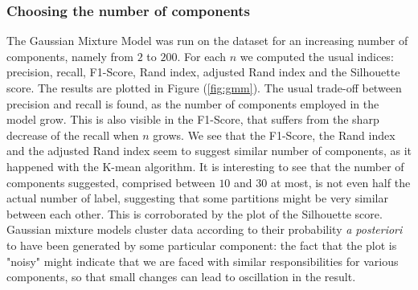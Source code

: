 \documentclass[a4paper]{article}
\begin{document}
 	\subsubsection{Choosing the number of components}
 
 	The Gaussian Mixture Model was run on the dataset for an increasing number of components, namely from $2$ to $200$. For each $n$ we computed the usual indices: precision, recall, F1-Score, Rand index, adjusted Rand index and the Silhouette score. The results are plotted in Figure (\ref{fig:gmm}).
 	The usual trade-off between precision and recall is found, as the number of components employed in the model grow. This is also visible in the F1-Score, that suffers from the sharp decrease of the recall when $n$ grows. We see that the F1-Score, the Rand index and the adjusted Rand index seem to suggest similar number of components, as it happened with the K-mean algorithm. It is interesting to see that the number of components suggested, comprised between $10$ and $30$ at most, is not even half the actual number of label, suggesting that some partitions might be very similar between each other. This is corroborated by the plot of the Silhouette score. Gaussian mixture models cluster data according to their probability \textit{a posteriori} to have been generated by some particular component: the fact that the plot is "noisy" might indicate that we are faced with similar responsibilities for various components, so that small changes can lead to oscillation in the result.
 	
\end{document}
